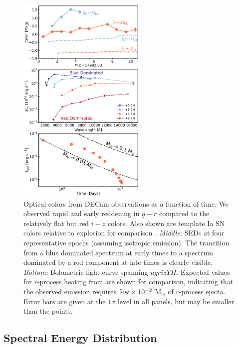 \begin{figure}[!t]
\begin{center}
\includegraphics[width=0.55\textwidth]{./figs/chapter5/sed_col_bol_alt.pdf}
\caption{\singlespace {} Optical colors from DECam observations as a function of time.  We observed rapid and early reddening in $g-r$ compared to the relatively flat but red $i-z$ colors. Also shown are template Ia SN colors relative to explosion for comparison \citep{Nugent+02}. {\it Middle:} SEDs at four representative epochs (assuming isotropic emission). The transition from a blue dominated spectrum at early times to a spectrum dominated by a red component at late times is clearly visible. {\it Bottom:} Bolometric light curve spanning $ugrizYH$. Expected values for $r$-process heating from \cite{Metzger+10} are shown for comparison, indicating that the observed emission requires ${\rm few}\times 10^{-2}$ M$_\odot$ of $r$-process ejecta. Error bars are given at the $1\sigma$ level in all panels, but may be smaller than the points.}
\label{fig:ch5_sed}
\end{center}
\end{figure}

\subsection{Spectral Energy Distribution}
\label{sec:ch5_SED}

